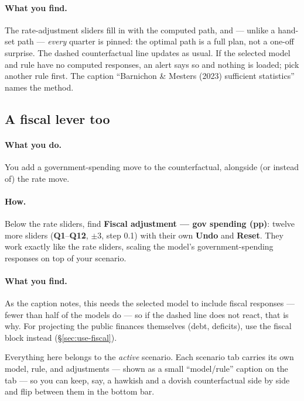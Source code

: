 \documentclass[11pt]{article}
\theoremstyle{definition}
\theoremstyle{remark}
\begin{document}
\paragraph{What you find.} The rate-adjustment sliders fill in with the
computed path, and --- unlike a hand-set path --- \emph{every} quarter is
pinned: the optimal path is a full plan, not a one-off surprise. The dashed
counterfactual line updates as usual. If the selected model and rule have no
computed responses, an alert says so and nothing is loaded; pick another
rule first. The caption ``Barnichon \& Mesters (2023) sufficient statistics''
names the method.

\subsection{A fiscal lever too}

\paragraph{What you do.} You add a government-spending move to the
counterfactual, alongside (or instead of) the rate move.

\paragraph{How.} Below the rate sliders, find \textbf{Fiscal adjustment ---
gov spending (pp)}: twelve more sliders (\textbf{Q1}--\textbf{Q12}, $\pm 3$,
step 0.1) with their own \textbf{Undo} and \textbf{Reset}. They work exactly
like the rate sliders, scaling the model's government-spending responses on
top of your scenario.

\paragraph{What you find.} As the caption notes, this needs the selected
model to include fiscal responses --- fewer than half of the models do ---
so if the dashed line does not react, that is why. For projecting the public
finances themselves (debt, deficits), use the fiscal block instead
(\S\ref{sec:use-fiscal}).

Everything here belongs to the \emph{active} scenario. Each scenario tab
carries its own model, rule, and adjustments --- shown as a small
``model/rule'' caption on the tab --- so you can keep, say, a hawkish and a
dovish counterfactual side by side and flip between them in the bottom bar.
\end{document}
